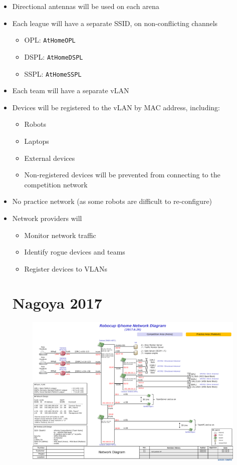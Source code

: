 \begin{itemize}[nosep]
	\item Directional antennas will be used on each arena
	\item Each league will have a separate SSID, on non-conflicting channels
	\begin{itemize}[nosep]
		\item OPL: \texttt{AtHomeOPL}
		\item DSPL: \texttt{AtHomeDSPL}
		\item SSPL: \texttt{AtHomeSSPL}
	\end{itemize}
	\item Each team will have a separate vLAN
	\item Devices will be registered to the vLAN by MAC address, including:
	\begin{itemize}[nosep]
		\item Robots
		\item Laptops
		\item External devices
		\item Non-registered devices will be prevented from connecting to the competition network
	\end{itemize}
	\item No practice network (as some robots are difficult to re-configure)
	\item Network providers will
	\begin{itemize}[nosep]
		\item Monitor network traffic
		\item Identify rogue devices and teams
		\item Register devices to VLANs
	\end{itemize}

\section{Nagoya 2017}
\begin{figure}[H]
	\includegraphics[width=\columnwidth]{images/nago2017_network.pdf}
\end{figure}

\end{itemize}

